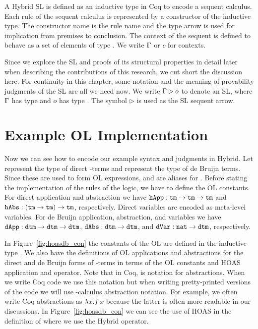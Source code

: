 
A Hybrid SL is defined as an inductive type in Coq to encode a sequent calculus. Each rule of the sequent calculus is represented by a constructor of the inductive type. The constructor name is the rule name and the type arrow is used for implication from premises to conclusion. The context of the sequent is defined to behave as a set of elements of type . We write $\Gamma{}$ or $c$ for contexts.

Since we explore the SL and proofs of its structural properties in detail later when describing the contributions of this research, we cut short the discussion here. For continuity in this chapter, some notation and the meaning of provability judgments of the SL are all we need now. We write $\Gamma{} \rhd o$ to denote an SL, where $\Gamma{}$ has type  and $o$ has type . The symbol $\rhd$ is used as the SL sequent arrow.


\section{Example OL Implementation}
\label{sec:hybrid_ol_imp}

Now we can see how to encode our example syntax and judgments in Hybrid. Let  represent the type of direct \lambda-terms and  represent the type of de Bruijn terms. Since these are used to form OL expressions,  and  are aliases for . Before stating the implementation of the rules of the logic, we have to define the OL constants. For direct application and abstraction we have $\texttt{hApp} : \texttt{tm} \rightarrow \texttt{tm} \rightarrow \texttt{tm}$ and $\texttt{hAbs} : (\texttt{tm} \rightarrow \texttt{tm}) \rightarrow \texttt{tm}$, respectively. Direct variables are encoded as meta-level variables. For de Bruijn application, abstraction, and variables we have $\texttt{dApp} : \texttt{dtm} \rightarrow \texttt{dtm} \rightarrow \texttt{dtm}$, $\texttt{dAbs} : \texttt{dtm} \rightarrow \texttt{dtm}$, and $\texttt{dVar} : \texttt{nat} \rightarrow \texttt{dtm}$, respectively.

In Figure~\ref{fig:hoasdb_con} the constants of the OL are defined in the inductive type . We also have the definitions of OL applications and abstractions for the direct and de Bruijn forms of \lambda-terms in terms of the OL constants and HOAS application and  operator. Note that in Coq,  is notation for abstractions. When we write Coq code we use this notation but when writing pretty-printed versions of the code we will use \lambda-calculus abstraction notation. For example, we often write Coq abstractions  as $\lambda x . f \; x$ because the latter is often more readable in our discussions. In Figure~\ref{fig:hoasdb_con} we can see the use of HOAS in the definition of  where we use the Hybrid  operator.

